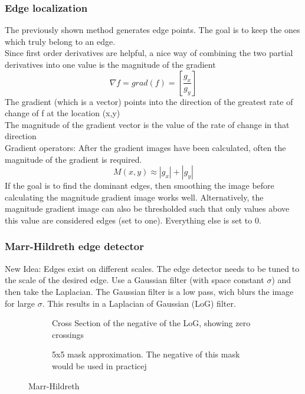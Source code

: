 \subsubsection{Edge localization}
The previously shown method generates edge points. The goal is to keep the ones which truly belong to an edge.\\
Since first order derivatives are helpful, a nice way of combining the two partial derivatives into one value is the magnitude of the gradient
\[
	\nabla f = grad(f) = \left[\frac{g_x}{g_y}\right]
\]
The gradient (which is a vector) points into the direction of the greatest rate of change of f at the location (x,y)\\
The magnitude of the gradient vector is the value of the rate of change in that direction\\
Gradient operators:
After the gradient images have been calculated, often the magnitude of the gradient is required.
\[
	M(x,y) \approx |g_x|+|g_y|
\]
If the goal is to find the dominant edges, then smoothing the image before calculating the magnitude gradient image works well. Alternatively, the magnitude gradient image can also be thresholded such that only values above this value are considered edges (set to one). Everything else is set to 0.

\subsubsection{Marr-Hildreth edge detector}
New Idea: Edges exist on different scales. The edge detector needs to be tuned to the scale of the desired edge. Use a Gaussian filter (with space constant $\sigma$) and then take the Laplacian. The Gaussian filter is a low pass, wich blurs the image for large $\sigma$. This results in a Laplacian of Gaussian (LoG) filter.
\begin{figure}[h]
	\centering
	\begin{subfigure}[b]{0.45\textwidth}
		\centering
		\caption{Cross Section of the negative of the LoG, showing zero crossings}
	\end{subfigure}
	\begin{subfigure}[b]{0.45\textwidth}
		\centering
		\caption{5x5 mask approximation. The negative of this mask would be used in practicej}
	\end{subfigure}
	\caption{Marr-Hildreth}
\end{figure}

